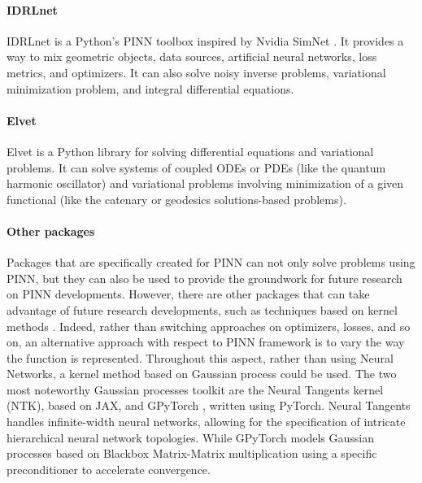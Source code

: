 \documentclass[pdflatex,sn-basic]{sn-jnl}%
\theoremstyle{thmstyleone}%
\theoremstyle{thmstyletwo}%
\theoremstyle{thmstylethree}%
\begin{document}
\paragraph{IDRLnet}  %

IDRLnet \citep{Pen2021_IdrlnetPhysicsInformed_ZhaPZZ} is a Python's PINN toolbox inspired by Nvidia SimNet  \citep{Hen2021_NvidiaSimnetAi_NarHNN}. It provides a  way to mix geometric objects, data sources, artificial neural networks, loss metrics, and optimizers.
It can also solve noisy inverse problems, variational minimization problem, and integral differential equations. 




\paragraph{Elvet}  %
Elvet \citep{Ara2021_ElvetNeuralNetwork_CriACS} is a Python library for solving differential equations and variational problems.
It can solve systems of coupled ODEs or PDEs (like the quantum harmonic oscillator) and variational problems involving minimization of a given functional (like the catenary or geodesics solutions-based problems).


\paragraph{Other packages} %
Packages that are specifically created for PINN can not only solve problems using PINN, but they can also be used to provide the groundwork for future research on PINN developments.
%
However, there are other packages that can take advantage of future research developments, such as techniques based on kernel methods \citep{Kar2021_PhysicsInformedMachine_KevKKL}.
Indeed, rather than switching approaches on optimizers, losses, and so on, an alternative approach with respect to PINN framework is to vary the way the function is represented.
Throughout this aspect, rather than using Neural Networks, a kernel method based on Gaussian process could be used. 
The two most noteworthy Gaussian processes toolkit are the Neural Tangents \citep{neuraltangents2020} kernel (NTK), based on JAX, and GPyTorch \citep{gardner2018gpytorch}, written using PyTorch. 
Neural Tangents handles infinite-width neural networks, allowing for the specification of intricate hierarchical neural network topologies. While GPyTorch models Gaussian processes based on Blackbox Matrix-Matrix multiplication using a specific preconditioner to accelerate convergence. 
\end{document}
